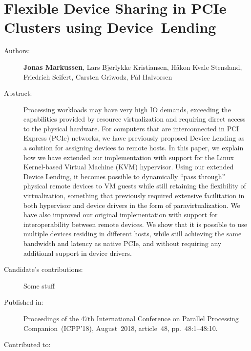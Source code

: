 \chapter{Flexible Device Sharing in PCIe Clusters using Device~Lending}
\label{paper:SRMPDS-2018}
\paperthumb

\begin{description}
	\item[Authors:]
		\textbf{Jonas Markussen}, Lars Bj{\o}rlykke Kristiansen, H{\aa}kon Kvale Stensland,
		Friedrich Seifert, Carsten Griwodz, P{\aa}l Halvorsen

	\item[Abstract:]
	Processing workloads may have very high IO demands, exceeding the capabilities provided by resource
	virtualization and requiring direct access to the physical hardware.
	For computers that are interconnected in PCI Express (PCIe) networks, we have previously proposed 
	Device Lending as a solution for assigning devices to remote hosts. In this paper, we
	explain how we have extended our implementation with support for the Linux Kernel-based Virtual
	Machine (KVM) hypervisor.
	Using our extended Device Lending, it becomes possible to dynamically ``pass through'' physical remote devices
	to VM guests while still retaining the flexibility of virtualization, something that previously required
	extensive facilitation in both hypervisor and device drivers in the form of paravirtualization.
	We have also improved our original implementation with support for interoperability between remote devices.
	We show that it is possible to use multiple devices residing in different hosts, while still achieving the same
	bandwidth and latency as native PCIe, and without requiring any additional support in device drivers. 


	\item[Candidate's contributions:]
		Some stuff

	\item[Published in:]
		Proceedings of the 47th International Conference on Parallel Processing Companion~(ICPP'18),
		August~2018, article~48, pp.~48:1--48:10.

	\item[Contributed to:]

\end{description}

